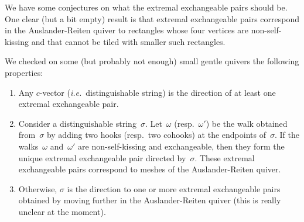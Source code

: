 \documentclass{amsart}
\newtheorem{conjecture}[theorem]{Conjecture}
\theoremstyle{definition}
\renewcommand{\b}[1]{{\boldsymbol{#1}}} %
\newcommand{\eqdef}{\mbox{\,\raisebox{0.2ex}{\scriptsize\ensuremath{\mathrm:}}\ensuremath{=}\,}} %
\newcommand{\ie}{\textit{i.e.}~} %
\newcommand{\gvector}[1]{\b{g}(#1)} %
\begin{document}
%

We have some conjectures on what the extremal exchangeable pairs should be.
One clear (but a bit empty) result is that extremal exchangeable pairs correspond in the Auslander-Reiten quiver to rectangles whose four vertices are non-self-kissing and that cannot be tiled with smaller such rectangles.

We checked on some (but probably not enough) small gentle quivers the following properties:
\begin{enumerate}
\item Any $c$-vector (\ie distinguishable string) is the direction of at least one extremal exchangeable pair.
\item Consider a distinguishable string~$\sigma$. Let~$\omega$ (resp.~$\omega'$) be the walk obtained from~$\sigma$ by adding two hooks (resp.~two cohooks) at the endpoints of~$\sigma$. If the walks~$\omega$ and~$\omega'$ are non-self-kissing and exchangeable, then they form the unique extremal exchangeable pair directed by~$\sigma$. These extremal exchangeable pairs correspond to meshes of the Auslander-Reiten quiver.
\item Otherwise, $\sigma$ is the direction to one or more extremal exchangeable pairs obtained by moving further in the Auslander-Reiten quiver (this is really unclear at the moment).
\end{enumerate}
\end{document}
